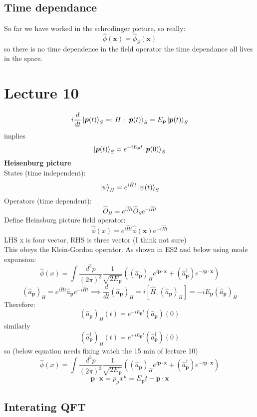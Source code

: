 \documentclass[12pt, a4paper, twoside, titlepage]{article}
\begin{document}
 \subsection{Time dependance}
 So far we have worked in the schrodinger picture, so really:
 $$
 \hat \phi(\bm x) = \hat \phi_S(\bm x)
 $$
 so there is no time dependence in the field operator the time dependance all lives in the space.
 \section{Lecture 10}
 $$
 i \frac{d}{dt} \ket{\bm p(t)}_S = :H:\ket{\bm p(t)}_S = E_{\bm p} \ket{\bm p(t)}_S
 $$
 implies
 $$
 \ket{\bm p(t)}_S = e^{-i E_{\bm p}t}\ket{\bm p(0)}_S
 $$
 \textbf{Heisenburg picture}\\
 States (time independent):
 $$
 \ket{\psi}_H = e^{i\hat H t}\ket{\psi(t)}_S
 $$
 Operators (time dependent):
 $$
 \hat O_H = e^{i \hat H t} \hat O_S e^{-i\hat H t}
 $$
 Define Heinsburg picture field operator:
 $$
 \hat \phi(x) = e^{i\hat Ht} \hat \phi(\bm x)e^{-i\hat H t}
 $$
 LHS x is four vector, RHS is three vector (I think not sure)\\
 This obeys the Klein-Gordon operator. As shown in ES2 and below using mode expansion:
 $$
 \hat \phi(x) = \int \frac{d^3 p}{(2\pi)^3} \frac{1}{\sqrt{2E_{\bm p}}} ( (\hat a_{\bm p})_H e^{i \bm p \cdot \bm x} + (\hat a^{\dagger}_{\bm p})e^{-i \bm p \cdot \bm x})
 $$
 $$
 (\hat a_{\bm p})_H = e^{i \hat H t} \hat a_{\bm p} e^{-i \hat H t} \implies \frac{d}{dt} (\hat a_{\bm p})_H = i [\hat H, (\hat a_{\bm p})_H] = -i E_{\bm p}(\hat a_{\bm p})_H
 $$
 Therefore:
 $$
 (\hat a_{\bm p})_H (t) = e^{-i E_{\bm p} t} (\hat a_{\bm p})(0)
 $$
 similarly 
 $$
 (\hat a^{\dagger}_{\bm p})_H (t) = e^{+i E_{\bm p} t} (\hat a^{\dagger}_{\bm p})(0)
 $$
 so (below equation needs fixing watch the 15 min of lecture 10)
 $$
 \hat \phi(x) = \int \frac{d^3 p}{(2\pi)^3} \frac{1}{\sqrt{2E_{\bm p}}} ( (\hat a_{\bm p})_H e^{i \bm p \cdot \bm x} + (\hat a^{\dagger}_{\bm p})e^{-i \bm p \cdot \bm x})
$$
 $$
 \bm p \cdot \bm x = p_{\mu}x^{\mu} = E_{\bm p}t - \bm p \cdot \bm x
 $$
 \subsection{Interating QFT}
\end{document}
